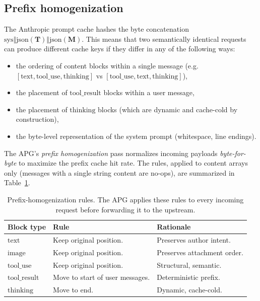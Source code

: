 \subsection{Prefix homogenization}
\label{app:apg:homog}

The Anthropic prompt cache hashes the byte concatenation
$\mathrm{sys} \Vert \mathrm{json}(\mathbf{T}) \Vert
\mathrm{json}(\mathbf{M})$. This means that two semantically
identical requests can produce different cache keys if they differ
in any of the following ways:
\begin{itemize}
  \item the ordering of content blocks within a single message
        (e.g.\ $[\mathrm{text}, \mathrm{tool\_use}, \mathrm{thinking}]$
        vs $[\mathrm{tool\_use}, \mathrm{text}, \mathrm{thinking}]$),
  \item the placement of $\mathrm{tool\_result}$ blocks within a
        user message,
  \item the placement of $\mathrm{thinking}$ blocks (which are
        dynamic and cache-cold by construction),
  \item the byte-level representation of the system prompt
        (whitespace, line endings).
\end{itemize}

The APG's \emph{prefix homogenization} pass normalizes incoming
payloads \emph{byte-for-byte} to maximize the prefix cache hit
rate. The rules, applied to content arrays only (messages with a
single string content are no-ops), are summarized in
Table~\ref{tab:homog}.

\begin{table}[ht]
\centering
\caption{Prefix-homogenization rules. The APG applies these rules to
every incoming request before forwarding it to the upstream.}
\label{tab:homog}
\begin{tabular}{lll}
\toprule
\textbf{Block type} & \textbf{Rule} & \textbf{Rationale} \\
\midrule
$\mathrm{text}$        & Keep original position. & Preserves author intent. \\
$\mathrm{image}$       & Keep original position. & Preserves attachment order. \\
$\mathrm{tool\_use}$   & Keep original position. & Structural, semantic. \\
$\mathrm{tool\_result}$ & Move to start of user messages. & Deterministic prefix. \\
$\mathrm{thinking}$    & Move to end. & Dynamic, cache-cold. \\
\bottomrule
\end{tabular}
\end{table}

